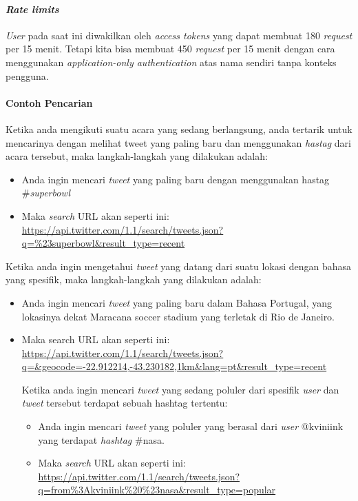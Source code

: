 \paragraph{\textit{Rate limits}}
\textit{User} pada saat ini diwakilkan oleh \textit{access tokens} yang dapat membuat 180 \textit{request} per 15 menit. Tetapi kita bisa membuat 450 \textit{request} per 15 menit dengan cara menggunakan \textit{application-only authentication} atas nama sendiri tanpa konteks pengguna.

\paragraph{Contoh Pencarian}
Ketika anda mengikuti suatu acara yang sedang berlangsung, anda tertarik untuk mencarinya dengan melihat tweet yang paling baru dan menggunakan \textit{hastag} dari acara tersebut, maka langkah-langkah yang dilakukan adalah:
\begin{itemize}
	\item Anda ingin mencari \textit{tweet} yang paling baru dengan menggunakan hastag \#\textit{superbowl}
	\item Maka \textit{search} URL akan seperti ini:
	\url{https://api.twitter.com/1.1/search/tweets.json?q=\%23superbowl\&result\_type=recent}
\end{itemize}

Ketika anda ingin mengetahui \textit{tweet} yang datang dari suatu lokasi dengan bahasa yang spesifik, maka langkah-langkah yang dilakukan adalah:
\begin{itemize}
	\item Anda ingin mencari \textit{tweet} yang paling baru dalam Bahasa Portugal, yang lokasinya dekat Maracana soccer stadium yang terletak di Rio de Janeiro.
	\item Maka search URL akan seperti ini:
	\url{https://api.twitter.com/1.1/search/tweets.json?q=\&geocode=-22.912214,-43.230182,1km\&lang=pt\&result\_type=recent}
	
Ketika anda ingin mencari \textit{tweet} yang sedang poluler dari spesifik \textit{user} dan \textit{tweet} tersebut terdapat sebuah hashtag tertentu:
\begin{itemize}
	\item Anda ingin mencari \textit{tweet} yang poluler yang berasal dari \textit{user} @kviniink yang terdapat \textit{hashtag} \#nasa.
	\item Maka \textit{search} URL akan seperti ini:
	\url{https://api.twitter.com/1.1/search/tweets.json?q=from\%3Akviniink\%20\%23nasa\&result\_type=popular}
\end{itemize}
\end{itemize}

